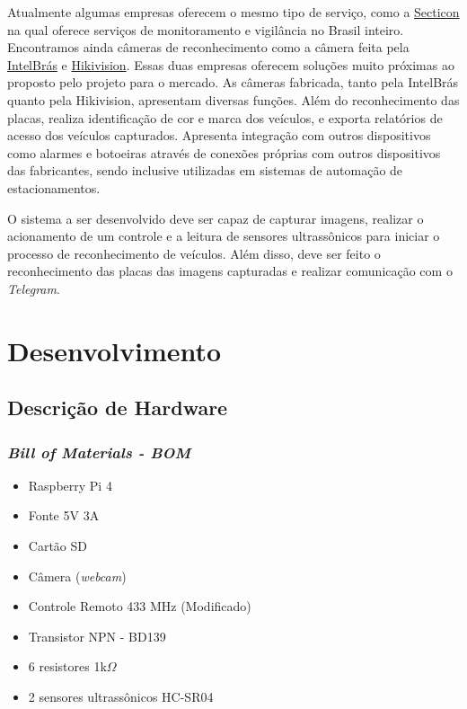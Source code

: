 \documentclass[conference]{IEEEtran}
\begin{document}
Atualmente algumas empresas oferecem o mesmo tipo de serviço, como a \href{https://www.secticom.com.br/lpr-controle-de-acesso-por-leitura-de-placa/}{Secticon} na qual oferece serviços de monitoramento e vigilância no Brasil inteiro. Encontramos ainda câmeras de reconhecimento como a câmera feita pela  \href{https://www.intelbras.com/pt-br/camera-ip-com-leitura-automatica-de-placas-vip-7250-lpr-ia-ft-g2}{IntelBrás} e \href{https://www.hikvision.com/pt-br/newsroom/blog/managing-vehicle-entry-with-anpr/}{Hikivision}. Essas duas empresas oferecem soluções muito próximas ao proposto pelo projeto para o mercado. As câmeras fabricada, tanto pela IntelBrás quanto pela Hikivision, apresentam diversas funções. Além do reconhecimento das placas, realiza identificação de cor e marca dos veículos, e exporta relatórios de acesso dos veículos capturados. Apresenta integração com outros dispositivos como alarmes e botoeiras através de conexões próprias com outros dispositivos das fabricantes, sendo inclusive utilizadas em sistemas de automação de estacionamentos. 

O sistema a ser desenvolvido deve ser capaz de capturar imagens, realizar o acionamento de um controle e a leitura de sensores ultrassônicos para iniciar o processo de reconhecimento de veículos. Além disso, deve ser feito o reconhecimento das placas das imagens capturadas e realizar comunicação com o \textit{Telegram}.

\section{Desenvolvimento}
\subsection{Descrição de Hardware}

\subsubsection{\textit{Bill of Materials - BOM}}

\begin{itemize}
    \item Raspberry Pi 4
    \item Fonte 5V 3A
    \item Cartão SD
    \item Câmera (\textit{webcam})
    \item Controle Remoto 433 MHz (Modificado)
    \item Transistor NPN - BD139
    \item 6 resistores 1k$\Omega$
    \item 2 sensores ultrassônicos HC-SR04

\end{itemize}
\end{document}
